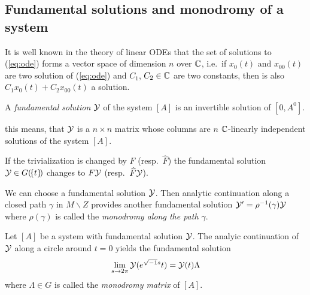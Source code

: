 \subsection{Fundamental solutions and monodromy of a system}
\begin{comment}
  See \cite[Sec.4.3.2]{Loday2014}
\end{comment}
It is well known in the theory of linear ODEs that the set of solutions to
(\ref{eq:ode}) forms a vector space of dimension $n$ over $\mathbb{C}$, i.e.\ if
$x_0(t)$ and $x_{00}(t)$ are two solution of (\ref{eq:ode}) and $C_1$,
$C_2\in\mathbb{C}$ are two constants, then is also $C_1x_0(t)+C_2x_{00}(t)$ a solution.

\begin{defn}
  A \emph{fundamental solution} $\mathcal{Y}$ of the system $[A]$ is an invertible
  solution of $[0,A^0]$.
  \begin{s-rem}
    this means, that $\mathcal{Y}$ is a $n\times n$ matrix  whose columns are $n$ $\mathbb{C}$-linearly independent solutions of the
    system $[A]$.
  \end{s-rem}
\end{defn}

\begin{rem}
  If the trivialization is changed by $F$ (resp.\ $\hat F$) the fundamental
  solution $\mathcal{Y}\in G(\!\{t\}\!)$ changes to $F\mathcal{Y}$ (resp.\ $\widehat F\mathcal{Y}$).
\end{rem}

\begin{comment}
  Unique \textbf{up to permutation}?\ or up to basis change?\ in the ramified
  case up to \TODO{}
\end{comment}

\begin{comment}
  for \textbf{monodromy} see \cite[130]{hotta2008}
\end{comment}
We can choose a fundamental solution $\mathcal{Y}$. Then analytic continuation along a
closed path $\gamma$ in $M\backslash Z$ provides another fundamental solution
$\mathcal{Y}'=\rho^{-1}(\gamma)\mathcal{Y}$ where $\rho(\gamma)$ is called the \emph{monodromy
along the path $\gamma$}.
\begin{defn}
  Let $[A]$ be a system with fundamental solution $\mathcal{Y}$.
  The analyic continuation of $\mathcal{Y}$ along a circle around $t=0$ yields the
  fundamental solution
  \[
    \lim_{s\to2\pi}\mathcal{Y}(e^{\sqrt{-1}s}t)=\mathcal{Y}(t)\Lambda
  \]
  where $\Lambda\in G$ is called the \emph{monodromy matrix} of $[A]$.
\end{defn}

